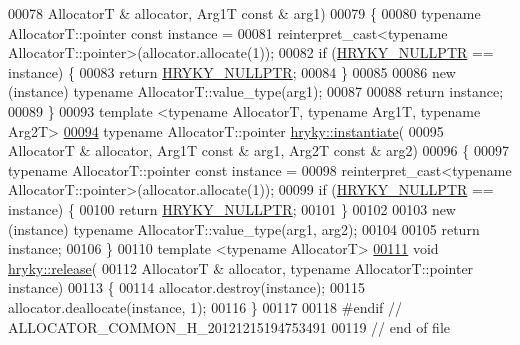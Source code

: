 \begin{DoxyCode}
00078     AllocatorT & allocator, Arg1T \textcolor{keyword}{const} & arg1)
00079 \{
00080     \textcolor{keyword}{typename} AllocatorT::pointer \textcolor{keyword}{const} instance =
00081         \textcolor{keyword}{reinterpret\_cast<}typename AllocatorT::pointer\textcolor{keyword}{>}(allocator.allocate(1));
00082     \textcolor{keywordflow}{if} (\hyperlink{common_8h_a4cd4ac09cfcdbd6b30ee69afc156e210}{HRYKY_NULLPTR} == instance) \{
00083         \textcolor{keywordflow}{return} \hyperlink{common_8h_a4cd4ac09cfcdbd6b30ee69afc156e210}{HRYKY_NULLPTR};
00084     \}
00085 
00086     \textcolor{keyword}{new} (instance) \textcolor{keyword}{typename} AllocatorT::value\_type(arg1);
00087     
00088     \textcolor{keywordflow}{return} instance;
00089 \}
00093 \textcolor{keyword}{template} <\textcolor{keyword}{typename} AllocatorT, \textcolor{keyword}{typename} Arg1T, \textcolor{keyword}{typename} Arg2T>
\hypertarget{allocator__common_8h_source_l00094}{}\hyperlink{namespacehryky_a0456c0aabb3bf6ffab33cb74f490761a}{00094} \textcolor{keyword}{typename} AllocatorT::pointer \hyperlink{namespacehryky_a7e731db6d90571cf1aea6e113d43b6ad}{hryky::instantiate}(
00095     AllocatorT & allocator, Arg1T \textcolor{keyword}{const} & arg1, Arg2T \textcolor{keyword}{const} & arg2)
00096 \{
00097     \textcolor{keyword}{typename} AllocatorT::pointer \textcolor{keyword}{const} instance =
00098         \textcolor{keyword}{reinterpret\_cast<}typename AllocatorT::pointer\textcolor{keyword}{>}(allocator.allocate(1));
00099     \textcolor{keywordflow}{if} (\hyperlink{common_8h_a4cd4ac09cfcdbd6b30ee69afc156e210}{HRYKY_NULLPTR} == instance) \{
00100         \textcolor{keywordflow}{return} \hyperlink{common_8h_a4cd4ac09cfcdbd6b30ee69afc156e210}{HRYKY_NULLPTR};
00101     \}
00102 
00103     \textcolor{keyword}{new} (instance) \textcolor{keyword}{typename} AllocatorT::value\_type(arg1, arg2);
00104     
00105     \textcolor{keywordflow}{return} instance;
00106 \}
00110 \textcolor{keyword}{template} <\textcolor{keyword}{typename} AllocatorT>
\hypertarget{allocator__common_8h_source_l00111}{}\hyperlink{namespacehryky_a9bdf380c3703ef316b807edae92a930a}{00111} \textcolor{keywordtype}{void} \hyperlink{namespacehryky_a9bdf380c3703ef316b807edae92a930a}{hryky::release}(
00112     AllocatorT & allocator, \textcolor{keyword}{typename} AllocatorT::pointer instance)
00113 \{
00114     allocator.destroy(instance);
00115     allocator.deallocate(instance, 1);
00116 \}
00117 
00118 \textcolor{preprocessor}{#endif // ALLOCATOR\_COMMON\_H\_20121215194753491}
00119 \textcolor{preprocessor}{}\textcolor{comment}{// end of file}
\end{DoxyCode}

